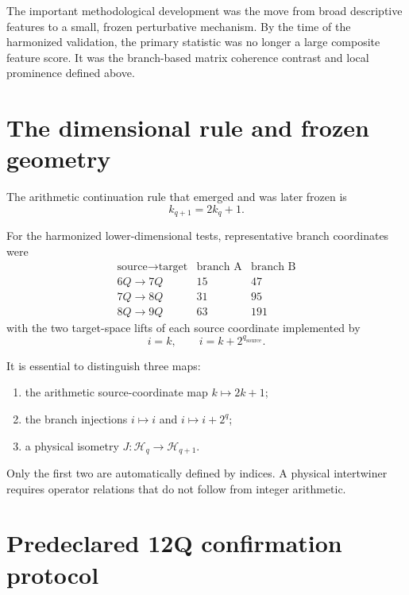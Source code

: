 \documentclass[11pt,a4paper]{article}
\newcommand{\cH}{\mathcal H}
\begin{document}
The important methodological development was the move from broad descriptive
features to a small, frozen perturbative mechanism.  By the time of the
harmonized validation, the primary statistic was no longer a large composite
feature score.  It was the branch-based matrix coherence contrast and local
prominence defined above.

\section{The dimensional rule and frozen geometry}

The arithmetic continuation rule that emerged and was later frozen is
\[
\boxed{k_{q+1}=2k_q+1.}
\]

For the harmonized lower-dimensional tests, representative branch coordinates
were
\[
\begin{array}{c|c|c}
\text{source}\to\text{target} & \text{branch A} & \text{branch B}\\
\hline
6Q\to7Q & 15 & 47\\
7Q\to8Q & 31 & 95\\
8Q\to9Q & 63 & 191
\end{array}
\]
with the two target-space lifts of each source coordinate implemented by
\[
i=k,\qquad i=k+2^{q_{\mathrm{source}}}.
\]

It is essential to distinguish three maps:

\begin{enumerate}[label=(\alph*)]
\item the arithmetic source-coordinate map \(k\mapsto2k+1\);
\item the branch injections \(i\mapsto i\) and
      \(i\mapsto i+2^q\);
\item a physical isometry \(J:\cH_q\to\cH_{q+1}\).
\end{enumerate}

Only the first two are automatically defined by indices.  A physical
intertwiner requires operator relations that do not follow from integer
arithmetic.


\section{Predeclared 12Q confirmation protocol}
\end{document}

